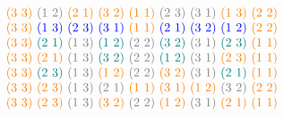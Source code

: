 \begin{xmpl}
$$\begin{tabular}{c}
		\textcolor{orange}{(3 3)} \textcolor{gray}{(1 2)} \textcolor{orange}{(2 1)} \textcolor{orange}{(3 2)} \textcolor{orange}{(1 1)} \textcolor{gray}{(2 3)} \textcolor{gray}{(3 1)} \textcolor{orange}{(1 3)} \textcolor{orange}{(2 2)}\\
		\textcolor{orange}{(3 3)} \textcolor{blue}{(1 3)} \textcolor{blue}{(2 3)} \textcolor{blue}{(3 1)} \textcolor{orange}{(1 1)} \textcolor{blue}{(2 1)} \textcolor{blue}{(3 2)} \textcolor{blue}{(1 2)} \textcolor{orange}{(2 2)}\\
		\textcolor{orange}{(3 3)} \textcolor{teal}{(2 1)} \textcolor{gray}{(1 3)} \textcolor{teal}{(1 2)} \textcolor{gray}{(2 2)} \textcolor{teal}{(3 2)} \textcolor{gray}{(3 1)} \textcolor{teal}{(2 3)} \textcolor{orange}{(1 1)}\\
		\textcolor{orange}{(3 3)} \textcolor{orange}{(2 1)} \textcolor{gray}{(1 3)} \textcolor{teal}{(3 2)} \textcolor{gray}{(2 2)} \textcolor{teal}{(1 2)} \textcolor{gray}{(3 1)} \textcolor{orange}{(2 3)} \textcolor{orange}{(1 1)}\\
		\textcolor{orange}{(3 3)} \textcolor{teal}{(2 3)} \textcolor{gray}{(1 3)} \textcolor{orange}{(1 2)} \textcolor{gray}{(2 2)} \textcolor{orange}{(3 2)} \textcolor{gray}{(3 1)} \textcolor{teal}{(2 1)} \textcolor{orange}{(1 1)}\\
		\textcolor{orange}{(3 3)} \textcolor{orange}{(2 3)} \textcolor{gray}{(1 3)} \textcolor{gray}{(2 1)} \textcolor{orange}{(1 1)} \textcolor{orange}{(3 1)} \textcolor{orange}{(1 2)} \textcolor{gray}{(3 2)} \textcolor{orange}{(2 2)}\\
		\textcolor{orange}{(3 3)} \textcolor{orange}{(2 3)} \textcolor{gray}{(1 3)} \textcolor{orange}{(3 2)} \textcolor{gray}{(2 2)} \textcolor{orange}{(1 2)} \textcolor{gray}{(3 1)} \textcolor{orange}{(2 1)} \textcolor{orange}{(1 1)}
	\end{tabular}
$$
\normalsize
\medskip
\end{xmpl}

